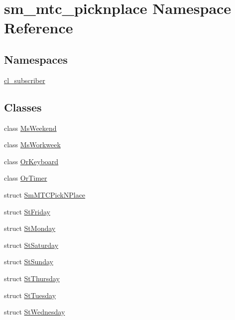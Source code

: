 \hypertarget{namespacesm__mtc__picknplace}{}\section{sm\+\_\+mtc\+\_\+picknplace Namespace Reference}
\label{namespacesm__mtc__picknplace}
\subsection*{Namespaces}
\begin{DoxyCompactItemize}
\item 
 \hyperlink{namespacesm__mtc__picknplace_1_1cl__subscriber}{cl\+\_\+subscriber}
\end{DoxyCompactItemize}
\subsection*{Classes}
\begin{DoxyCompactItemize}
\item 
class \hyperlink{classsm__mtc__picknplace_1_1MsWeekend}{Ms\+Weekend}
\item 
class \hyperlink{classsm__mtc__picknplace_1_1MsWorkweek}{Ms\+Workweek}
\item 
class \hyperlink{classsm__mtc__picknplace_1_1OrKeyboard}{Or\+Keyboard}
\item 
class \hyperlink{classsm__mtc__picknplace_1_1OrTimer}{Or\+Timer}
\item 
struct \hyperlink{structsm__mtc__picknplace_1_1SmMTCPickNPlace}{Sm\+M\+T\+C\+Pick\+N\+Place}
\item 
struct \hyperlink{structsm__mtc__picknplace_1_1StFriday}{St\+Friday}
\item 
struct \hyperlink{structsm__mtc__picknplace_1_1StMonday}{St\+Monday}
\item 
struct \hyperlink{structsm__mtc__picknplace_1_1StSaturday}{St\+Saturday}
\item 
struct \hyperlink{structsm__mtc__picknplace_1_1StSunday}{St\+Sunday}
\item 
struct \hyperlink{structsm__mtc__picknplace_1_1StThursday}{St\+Thursday}
\item 
struct \hyperlink{structsm__mtc__picknplace_1_1StTuesday}{St\+Tuesday}
\item 
struct \hyperlink{structsm__mtc__picknplace_1_1StWednesday}{St\+Wednesday}
\end{DoxyCompactItemize}
